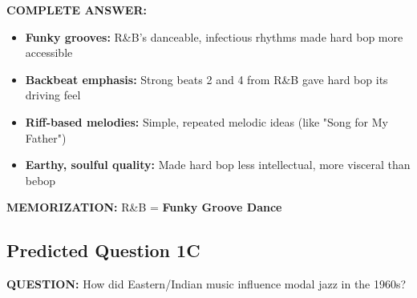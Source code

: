 \documentclass[11pt]{article}
\begin{document}
\begin{mdframed}[backgroundcolor=answercolor!10, linewidth=2pt]
\textbf{\textcolor{answercolor}{COMPLETE ANSWER:}}

\begin{itemize}[leftmargin=*, nosep]
    \item \textbf{Funky grooves:} R\&B's danceable, infectious rhythms made hard bop more accessible
    \item \textbf{Backbeat emphasis:} Strong beats 2 and 4 from R\&B gave hard bop its driving feel
    \item \textbf{Riff-based melodies:} Simple, repeated melodic ideas (like "Song for My Father")
    \item \textbf{Earthy, soulful quality:} Made hard bop less intellectual, more visceral than bebop
\end{itemize}

\vspace{5pt}
\end{mdframed}

\textbf{MEMORIZATION:} R\&B = \textbf{\textcolor{hardbop}{Funky Groove Dance}}

\subsection*{Predicted Question 1C}

\begin{mdframed}[backgroundcolor=questioncolor!10, linewidth=2pt]
\textbf{\textcolor{questioncolor}{QUESTION:}} How did Eastern/Indian music influence modal jazz in the 1960s?
\end{mdframed}
\end{document}
